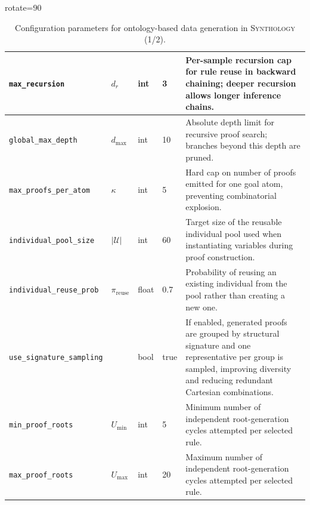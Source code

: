 \documentclass{IOS-Book-Article}     %
\begin{document}
\begin{table}[h!]
\begin{adjustbox}{rotate=90}
\begin{tabular}{|l|l|l|l|p{9.76cm}|}
			\texttt{max\_recursion}            & $d_r$                & int           & 3                & Per-sample recursion cap for rule reuse in backward chaining; deeper recursion allows longer inference chains.                                                                   \\
			\hline
			\texttt{global\_max\_depth}        & $d_{\max}$           & int           & 10               & Absolute depth limit for recursive proof search; branches beyond this depth are pruned.                                                                                          \\
			\hline
			\texttt{max\_proofs\_per\_atom}    & $\kappa$             & int           & 5                & Hard cap on number of proofs emitted for one goal atom, preventing combinatorial explosion.                                                                                      \\
			\hline
			\texttt{individual\_pool\_size}    & $|\mathcal{U}|$      & int           & 60               & Target size of the reusable individual pool used when instantiating variables during proof construction.                                                                         \\
			\hline
			\texttt{individual\_reuse\_prob}   & $\pi_{\text{reuse}}$ & float         & 0.7              & Probability of reusing an existing individual from the pool rather than creating a new one.                                                                                      \\
			\hline
			\texttt{use\_signature\_sampling}  &                      & bool          & true             & If enabled, generated proofs are grouped by structural signature and one representative per group is sampled, improving diversity and reducing redundant Cartesian combinations. \\
			\hline
			\texttt{min\_proof\_roots}         & $U_{\min}$           & int           & 5                & Minimum number of independent root-generation cycles attempted per selected rule.                                                                                                \\
			\hline
			\texttt{max\_proof\_roots}         & $U_{\max}$           & int           & 20               & Maximum number of independent root-generation cycles attempted per selected rule.                                                                                                \\
			\hline
		\end{tabular}
	\end{adjustbox}
	\caption{Configuration parameters for ontology-based data generation in \textsc{Synthology} (1/2).}
	\label{tab:synthology-config}
\end{table}
\end{document}
